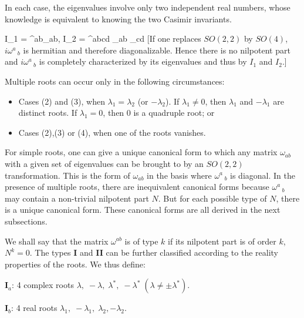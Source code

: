 In each case, the eigenvalues involve only two independent real
numbers, whose knowledge is equivalent to knowing the two
Casimir invariants.

\bb
I_1 = \omega^{ab}\omega_{ab}, \;\;\; I_2 = \m \epsilon^{abcd}
\omega_{ab} \omega_{cd}
\label{a.9}
\ee
%
[If one replaces $SO(2,2)$ by $SO(4)$, $i\omega^a\,_b$ is
hermitian and therefore diagonalizable. Hence there is no
nilpotent part and $i\omega^a\,_b$ is completely
characterized by its eigenvalues and thus by $I_1$ and $I_2$.]

Multiple roots can occur only in the following circumstances:

\begin{itemize}
\item Cases (2) and (3), when $\lambda_1= \lambda_2$ (or $-\lambda_2$). If
$\lambda_1 \neq 0$, then $\lambda_1$ and $-\lambda_1$ are
distinct roots. If $\lambda_1=0$, then 0 is a quadruple root; or

\item Cases (2),(3) or (4), when one of the roots vanishes.
\end{itemize}
\vspace{1cm}





For simple roots, one can give a unique canonical form to which
any matrix $\omega_{ab}$ with a given set of eigenvalues can
be brought to by an $SO(2,2)$ transformation. This is the form
of $\omega_{ab}$ in the basis where $\omega^a\,_b$ is
diagonal.  In the presence of multiple roots, there are
inequivalent canonical forms because $\omega^a\,_b$ may contain a
non-trivial nilpotent part $N$. But for each possible type of
$N$, there is a unique canonical form.  These canonical forms
are all derived in the next subsections.

We shall say that the matrix $\omega^{ab}$ is of type $k$ if its
nilpotent part is of order $k$, $N^k =0$. The types {\bf I} and
{\bf II} can be further classified according to the reality
properties of the roots. We thus define:
\\

{\bf I$_a$}: 4  complex roots $\lambda,\; -\lambda,\;
\lambda^*,\; -\lambda^*\; (\lambda \neq \pm \lambda^*)$.

{\bf I$_b$}: 4 real roots $\lambda_1,\; -\lambda_1,\;
\lambda_2, -\lambda_2$.

